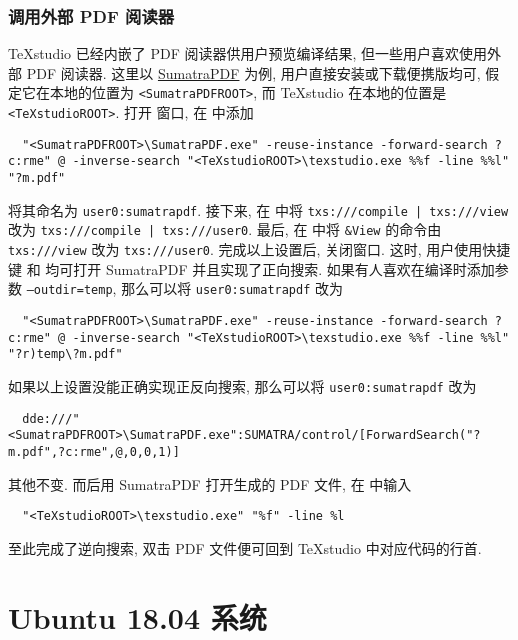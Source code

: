 \subsubsection{调用外部 PDF 阅读器}

\TeX studio 已经内嵌了 PDF 阅读器供用户预览编译结果,
但一些用户喜欢使用外部 PDF 阅读器.
这里以 \href{https://www.sumatrapdfreader.org/free-pdf-reader.html}{SumatraPDF} 为例,
用户直接安装或下载便携版均可,
假定它在本地的位置为 \texttt{<SumatraPDFROOT>},
而 \TeX studio 在本地的位置是 \texttt{<TeXstudioROOT>}.
打开  窗口,
在  中添加
\begin{lstlisting}
  "<SumatraPDFROOT>\SumatraPDF.exe" -reuse-instance -forward-search ?c:rme" @ -inverse-search "<TeXstudioROOT>\texstudio.exe %%f -line %%l" "?m.pdf"
\end{lstlisting}
将其命名为 \texttt{user0:sumatrapdf}.
接下来, 在  中将
\texttt{txs:///compile | txs:///view} 改为
\texttt{txs:///compile | txs:///user0}.
最后, 在  中将 \texttt{\&View} 的命令由
\texttt{txs:///view} 改为 \texttt{txs:///user0}.
完成以上设置后,
关闭窗口.
这时,
用户使用快捷键  和  均可打开 SumatraPDF 并且实现了正向搜索.
如果有人喜欢在编译时添加参数 \texttt{--outdir=temp},
那么可以将 \texttt{user0:sumatrapdf} 改为
\begin{lstlisting}
  "<SumatraPDFROOT>\SumatraPDF.exe" -reuse-instance -forward-search ?c:rme" @ -inverse-search "<TeXstudioROOT>\texstudio.exe %%f -line %%l" "?r)temp\?m.pdf"
\end{lstlisting}

如果以上设置没能正确实现正反向搜索,
那么可以将 \texttt{user0:sumatrapdf} 改为
\begin{lstlisting}
  dde:///"<SumatraPDFROOT>\SumatraPDF.exe":SUMATRA/control/[ForwardSearch("?m.pdf",?c:rme",@,0,0,1)]
\end{lstlisting}
其他不变.
而后用 SumatraPDF 打开生成的 PDF 文件,
在  中输入
\begin{lstlisting}
  "<TeXstudioROOT>\texstudio.exe" "%f" -line %l
\end{lstlisting}
至此完成了逆向搜索,
双击 PDF 文件便可回到 \TeX studio 中对应代码的行首.

\section{Ubuntu 18.04 系统}

